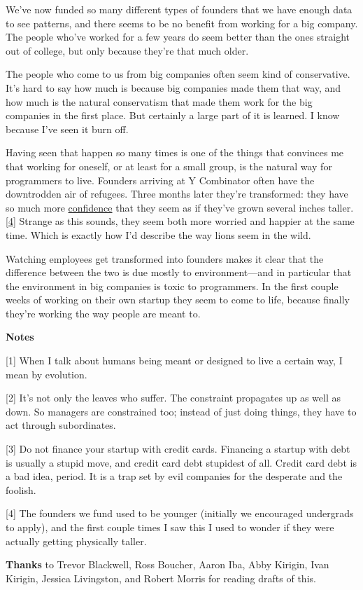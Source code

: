 We've now funded so many different types of founders that we have enough
data to see patterns, and there seems to be no benefit from working for
a big company. The people who've worked for a few years do seem better
than the ones straight out of college, but only because they're that
much older.

The people who come to us from big companies often seem kind of
conservative. It's hard to say how much is because big companies made
them that way, and how much is the natural conservatism that made them
work for the big companies in the first place. But certainly a large
part of it is learned. I know because I've seen it burn off.

Having seen that happen so many times is one of the things that
convinces me that working for oneself, or at least for a small group, is
the natural way for programmers to live. Founders arriving at Y
Combinator often have the downtrodden air of refugees. Three months
later they're transformed: they have so much more
\href{http://paulmckellar.com/photos/03l}{confidence} that they seem as
if they've grown several inches taller. {[}\hyperref[f4n]{4}{]} Strange
as this sounds, they seem both more worried and happier at the same
time. Which is exactly how I'd describe the way lions seem in the wild.

Watching employees get transformed into founders makes it clear that the
difference between the two is due mostly to environment---and in
particular that the environment in big companies is toxic to
programmers. In the first couple weeks of working on their own startup
they seem to come to life, because finally they're working the way
people are meant to.

\textbf{Notes}

{[}1{]} When I talk about humans being meant or designed to live a
certain way, I mean by evolution.

{[}2{]} It's not only the leaves who suffer. The constraint propagates
up as well as down. So managers are constrained too; instead of just
doing things, they have to act through subordinates.

{[}3{]} Do not finance your startup with credit cards. Financing a
startup with debt is usually a stupid move, and credit card debt
stupidest of all. Credit card debt is a bad idea, period. It is a trap
set by evil companies for the desperate and the foolish.

{[}4{]} The founders we fund used to be younger (initially we encouraged
undergrads to apply), and the first couple times I saw this I used to
wonder if they were actually getting physically taller.

\textbf{Thanks} to Trevor Blackwell, Ross Boucher, Aaron Iba, Abby
Kirigin, Ivan Kirigin, Jessica Livingston, and Robert Morris for reading
drafts of this.
